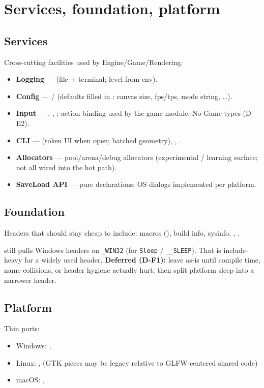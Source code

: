 \section{Services, foundation, platform}
\label{sec:services}

\subsection{Services}
Cross-cutting facilities used by Engine/Game/Rendering:
\begin{itemize}
  \item \textbf{Logging} ---  (file + terminal; level from env).
  \item \textbf{Config} ---  / 
        (defaults filled in : canvas size, fps/tps,
        mode string, \ldots).
  \item \textbf{Input} --- , ,
        ; action binding used by the game module.
        No Game types (D-E2).
  \item \textbf{CLI} ---  (token UI when open; batched
        geometry), , .
  \item \textbf{Allocators} --- pool/arena/debug allocators (experimental /
        learning surface; not all wired into the hot path).
  \item \textbf{SaveLoad API} --- pure declarations; OS dialogs implemented
        per platform.
\end{itemize}

\subsection{Foundation}
Headers that should stay cheap to include:
macros (), build info, sysinfo, ,
.

\begin{statusbox}
 still pulls Windows headers on \texttt{\_WIN32} (for
\texttt{Sleep} / \texttt{\_\_SLEEP}). That is include-heavy for a widely used
header. \textbf{Deferred (D-F1):} leave as-is until compile time, name
collisions, or header hygiene actually hurt; then split platform sleep into a
narrower header.
\end{statusbox}

\subsection{Platform}
Thin ports:
\begin{itemize}
  \item Windows: , 
  \item Linux: , 
        (GTK pieces may be legacy relative to GLFW-centered shared code)
  \item macOS: , 
\end{itemize}

